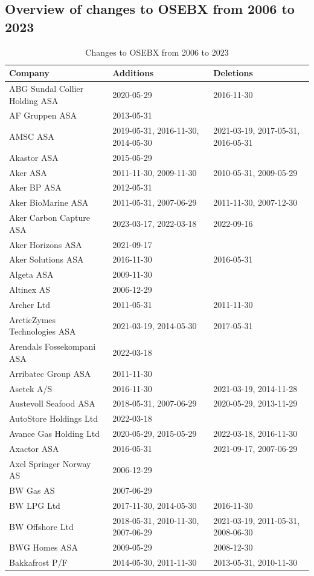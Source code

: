 \subsection{Overview of changes to OSEBX from 2006 to 2023}

\vspace{-1em}
\begin{table}[H]
\centering
\caption{Changes to OSEBX from 2006 to 2023}
\label{changes-osebx-2006-2023}
\vspace{1em}
\begin{tabularx}{\textwidth}{XXX}
\toprule
Company & Additions & Deletions \\ 
\midrule
ABG Sundal Collier Holding ASA & 2020-05-29 & 2016-11-30 \\
AF Gruppen ASA & 2013-05-31 & \\
AMSC ASA & 2019-05-31, 2016-11-30, 2014-05-30 & 2021-03-19, 2017-05-31, 2016-05-31 \\
Akastor ASA & 2015-05-29 & \\
Aker ASA & 2011-11-30, 2009-11-30 & 2010-05-31, 2009-05-29 \\
Aker BP ASA & 2012-05-31 & \\
Aker BioMarine ASA & 2011-05-31, 2007-06-29 & 2011-11-30, 2007-12-30 \\
Aker Carbon Capture ASA & 2023-03-17, 2022-03-18 & 2022-09-16 \\
Aker Horizons ASA & 2021-09-17 & \\
Aker Solutions ASA & 2016-11-30 & 2016-05-31 \\
Algeta ASA & 2009-11-30 & \\
Altinex AS & 2006-12-29 & \\
Archer Ltd & 2011-05-31 & 2011-11-30 \\
ArcticZymes Technologies ASA & 2021-03-19, 2014-05-30 & 2017-05-31 \\
Arendals Fossekompani ASA & 2022-03-18 & \\
Arribatec Group ASA & 2011-11-30 & \\
Asetek A/S & 2016-11-30 & 2021-03-19, 2014-11-28 \\
Austevoll Seafood ASA & 2018-05-31, 2007-06-29 & 2020-05-29, 2013-11-29 \\
AutoStore Holdings Ltd & 2022-03-18 & \\
Avance Gas Holding Ltd & 2020-05-29, 2015-05-29 & 2022-03-18, 2016-11-30 \\
Axactor ASA & 2016-05-31 & 2021-09-17, 2007-06-29 \\
Axel Springer Norway AS & 2006-12-29 & \\
BW Gas AS & 2007-06-29 & \\
BW LPG Ltd & 2017-11-30, 2014-05-30 & 2016-11-30 \\
BW Offshore Ltd & 2018-05-31, 2010-11-30, 2007-06-29 & 2021-03-19, 2011-05-31, 2008-06-30 \\
BWG Homes ASA & 2009-05-29 & 2008-12-30 \\
Bakkafrost P/F & 2014-05-30, 2011-11-30 & 2013-05-31, 2010-11-30 \\
\bottomrule
\end{tabularx}
\end{table}

